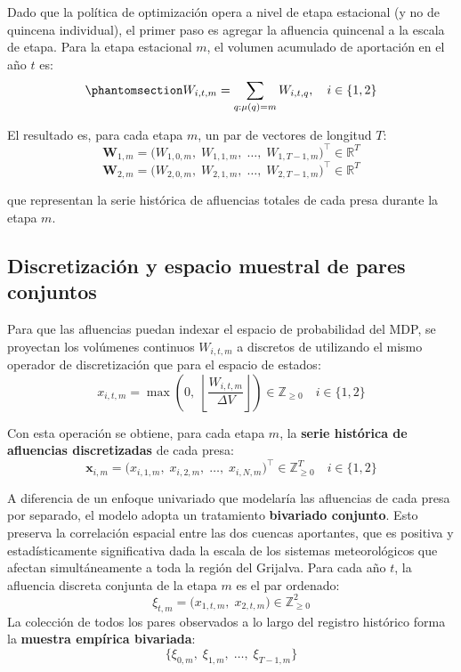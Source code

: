 \documentclass[
  spanish,
  letterpaper,
]{scrreprt}
\theoremstyle{definition}
\theoremstyle{remark}
\begin{document}
Dado que la política de optimización opera a nivel de etapa estacional
(y no de quincena individual), el primer paso es agregar la afluencia
quincenal a la escala de etapa. Para la etapa estacional \(m\), el
volumen acumulado de aportación en el año \(t\) es:
\begin{equation}\protect\phantomsection\label{eq-afluencias-etapa}{W_{i,t,m} = \sum_{q : \mu(q) = m} W_{i,t,q}, \quad i \in \{1, 2\}}\end{equation}

El resultado es, para cada etapa \(m\), un par de vectores de longitud
\(T\): \[
\mathbf{W}_{1,m} = \bigl(W_{1,0,m},\; W_{1,1,m},\; \ldots,\; W_{1,T-1,m}\bigr)^\top \in \mathbb{R}^T
\] \[
\mathbf{W}_{2,m} = \bigl(W_{2,0,m},\; W_{2,1,m},\; \ldots,\; W_{2,T-1,m}\bigr)^\top \in \mathbb{R}^T
\]

que representan la serie histórica de afluencias totales de cada presa
durante la etapa \(m\).

\subsection{Discretización y espacio muestral de pares
conjuntos}\label{discretizaciuxf3n-y-espacio-muestral-de-pares-conjuntos}

Para que las afluencias puedan indexar el espacio de probabilidad del
MDP, se proyectan los volúmenes continuos \(W_{i,t,m}\) a discretos de
utilizando el mismo operador de discretización que para el espacio de
estados: \[
x_{i,t,m} = \max\!\left(0,\; \left\lfloor \frac{W_{i,t,m}}{\Delta V} \right\rfloor\right) \in \mathbb{Z}_{\ge 0}
\quad i \in \{1,2\}
\]

Con esta operación se obtiene, para cada etapa \(m\), la \textbf{serie
histórica de afluencias discretizadas} de cada presa: \[
\mathbf{x}_{i,m} = \bigl(x_{i,1,m},\; x_{i,2,m},\; \ldots,\; x_{i,N,m}\bigr)^\top \in \mathbb{Z}_{\ge 0}^T
\quad i \in \{1,2\}
\]

A diferencia de un enfoque univariado que modelaría las afluencias de
cada presa por separado, el modelo adopta un tratamiento
\textbf{bivariado conjunto}. Esto preserva la correlación espacial entre
las dos cuencas aportantes, que es positiva y estadísticamente
significativa dada la escala de los sistemas meteorológicos que afectan
simultáneamente a toda la región del Grijalva. Para cada año \(t\), la
afluencia discreta conjunta de la etapa \(m\) es el par ordenado: \[
\xi_{t,m} = \bigl(x_{1,t,m},\; x_{2,t,m}\bigr) \in \mathbb{Z}_{\ge 0}^2
\] La colección de todos los pares observados a lo largo del registro
histórico forma la \textbf{muestra empírica bivariada}: \[
\bigl\{\xi_{0,m},\; \xi_{1,m},\; \ldots,\; \xi_{T-1,m}\bigr\}
\]
\end{document}
